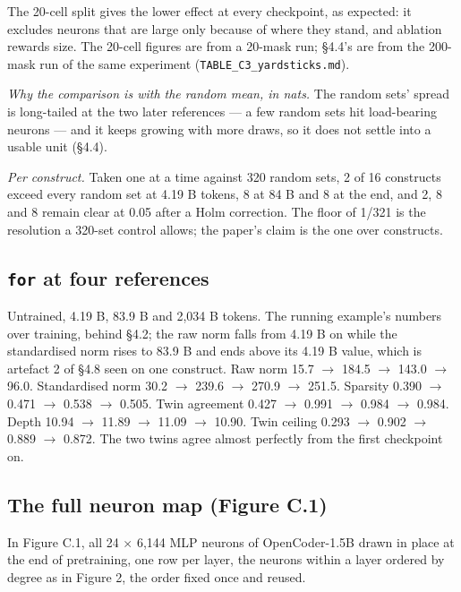 \documentclass{article}
\begin{document}
The 20-cell split gives the lower effect at every checkpoint, as expected: it excludes neurons that are large only because of where they stand, and ablation rewards size. The 20-cell figures are from a 20-mask run; \S4.4's are from the 200-mask run of the same experiment (\texttt{TABLE\_C3\_yardsticks.md}).

\emph{Why the comparison is with the random mean, in nats.} The random sets' spread is long-tailed at the two later references --- a few random sets hit load-bearing neurons --- and it keeps growing with more draws, so it does not settle into a usable unit (\S4.4).

\emph{Per construct.} Taken one at a time against 320 random sets, 2 of 16 constructs exceed every random set at 4.19 B tokens, 8 at 84 B and 8 at the end, and 2, 8 and 8 remain clear at 0.05 after a Holm correction. The floor of 1/321 is the resolution a 320-set control allows; the paper's claim is the one over constructs.

\subsection{\texttt{for} at four references}

Untrained, 4.19 B, 83.9 B and 2,034 B tokens. The running example's numbers over training, behind \S4.2; the raw norm falls from 4.19 B on while the standardised norm rises to 83.9 B and ends above its 4.19 B value, which is artefact 2 of \S4.8 seen on one construct. Raw norm 15.7 $\rightarrow$ 184.5 $\rightarrow$ 143.0 $\rightarrow$ 96.0. Standardised norm 30.2 $\rightarrow$ 239.6 $\rightarrow$ 270.9 $\rightarrow$ 251.5. Sparsity 0.390 $\rightarrow$ 0.471 $\rightarrow$ 0.538 $\rightarrow$ 0.505. Twin agreement 0.427 $\rightarrow$ 0.991 $\rightarrow$ 0.984 $\rightarrow$ 0.984. Depth 10.94 $\rightarrow$ 11.89 $\rightarrow$ 11.09 $\rightarrow$ 10.90. Twin ceiling 0.293 $\rightarrow$ 0.902 $\rightarrow$ 0.889 $\rightarrow$ 0.872. The two twins agree almost perfectly from the first checkpoint on.

\subsection{The full neuron map (Figure C.1)}

In Figure C.1, all 24 $\times$ 6,144 MLP neurons of OpenCoder-1.5B drawn in place at the end of pretraining, one row per layer, the neurons within a layer ordered by degree as in Figure 2, the order fixed once and reused.
\end{document}
